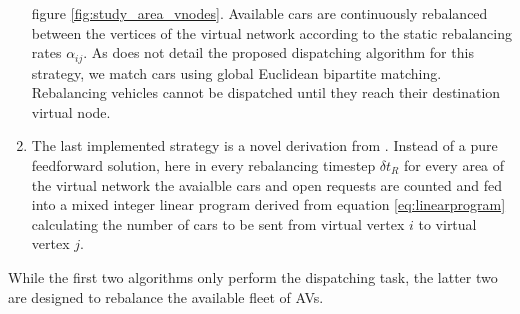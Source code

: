 \begin{enumerate}
figure \ref{fig:study_area_vnodes}. Available cars are continuously rebalanced between
the vertices of the virtual network according to the static rebalancing rates $\alpha_{ij}$.
As \cite{pavone2011load} does not detail the proposed dispatching algorithm for this strategy, we match
cars using global Euclidean bipartite matching. Rebalancing vehicles cannot be dispatched
until they reach their destination virtual node.
\item The last implemented strategy is a novel derivation from \cite{pavone2011load}. Instead of a pure
feedforward solution, here in every rebalancing timestep $\delta t_R$
for every area of the virtual network the avaialble cars and open requests are counted
and fed into a mixed integer linear program derived from equation \ref{eq:linearprogram}
calculating the number of cars to be sent from virtual vertex $i$ to virtual vertex $j$.
\end{enumerate}

While the first two algorithms only perform the dispatching task, the latter two
are designed to rebalance the available fleet of AVs.
